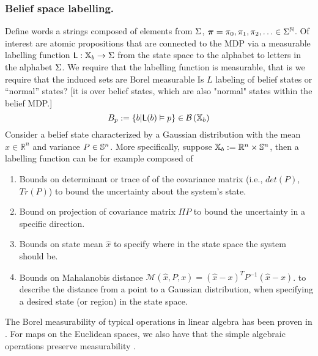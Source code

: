 \documentclass{ifacconf}
\begin{document}
    
    
	\subsubsection{Belief space labelling.}\label{sec:DTL}  
Define words a strings composed of elements from $\alphabeth$, $\word=\letter_0,\letter_1,\letter_2,\ldots\in\alphabeth^{\mathbb{N}}$.
Of interest are atomic propositions that are connected to the MDP via a measurable labelling function $\Lab:\Xb\rightarrow \alphabeth$ from the state space to the alphabet to letters in the alphabet $\alphabeth$. 
We require that the labelling function is measurable, that is we require that the induced sets  are Borel measurable
{\color{blue} Is $L$ labeling of belief states or ``normal'' states? [it is over belief states, which are also "normal" states within the belief MDP.]}
\[B_p:=\{b|\Lab(b)\vDash p \}\in \borel{\Xb}\]      
Consider a belief state characterized by  a Gaussian distribution with the mean $\hat x\in \mathbb R^n $ and variance $P\in\S^n$. %
 More specifically, suppose  $\Xb:=\mathbb R^n\times \S^n$,  then a labelling function  can be for example composed of %
     \begin{enumerate}
 	\item Bounds on determinant or trace of of the covariance matrix (i.e., $det(P)$, $Tr(P)$) to  bound the uncertainty about the system's state.
 	\item Bound on projection of covariance matrix $\Pi P$ to bound the uncertainty in a specific direction.
   \item   Bounds on state mean $\hat{x}$ to specify
    where in the state space the system should be. 
    \item Bounds on Mahalanobis distance $\mathcal{M}(\hat{x},P,x) = (\hat{x}-x)^TP^{-1}(\hat{x}-x)$.
    to describe the distance from a point to a Gaussian distribution, when specifying a desired state (or region) in the state space. 
    \end{enumerate}
 
    The Borel measurability of typical operations in linear algebra has been proven in \citep{azoff1974borel}.
For maps on the Euclidean spaces, we also have that the simple algebraic operations  preserve measurability \citep[page 116]{lang1993real}.
 
\end{document}
